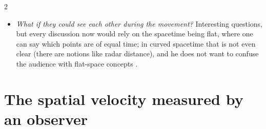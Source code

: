 \begin{paracol}{2}
\begin{coursenote}
\begin{itemize}
  \item \emph{What if they could see each other during the movement?} Interesting questions, but every discussion now would rely on the spacetime being flat, where one can say which points are of equal time; in curved spacetime that is not even clear (there are notions like radar distance), and he does not want to confuse the audience with flat-space concepts .
\end{itemize}
\end{coursenote}

\section{The spatial velocity measured by an observer}\label{sec:c13-velocity}


\end{paracol}
